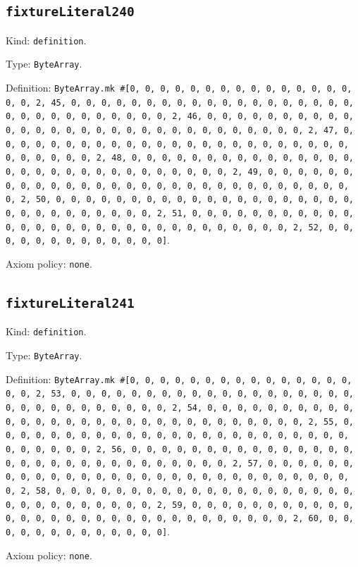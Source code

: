 \documentclass[11pt]{article}
\begin{document}
\subsection*{\texttt{fixtureLiteral240}}
\noindent Kind: \texttt{definition}.\par
\noindent Type: \texttt{ByteArray}.\par
\noindent Definition: \texttt{ByteArray.mk \#[0, 0, 0, 0, 0, 0, 0, 0, 0, 0, 0, 0, 0, 0, 0, 0, 0, 2, 45, 0, 0, 0, 0, 0, 0, 0, 0, 0, 0, 0, 0, 0, 0, 0, 0, 0, 0, 0, 0, 0, 0, 0, 0, 0, 0, 0, 0, 0, 0, 2, 46, 0, 0, 0, 0, 0, 0, 0, 0, 0, 0, 0, 0, 0, 0, 0, 0, 0, 0, 0, 0, 0, 0, 0, 0, 0, 0, 0, 0, 0, 0, 2, 47, 0, 0, 0, 0, 0, 0, 0, 0, 0, 0, 0, 0, 0, 0, 0, 0, 0, 0, 0, 0, 0, 0, 0, 0, 0, 0, 0, 0, 0, 0, 2, 48, 0, 0, 0, 0, 0, 0, 0, 0, 0, 0, 0, 0, 0, 0, 0, 0, 0, 0, 0, 0, 0, 0, 0, 0, 0, 0, 0, 0, 0, 0, 2, 49, 0, 0, 0, 0, 0, 0, 0, 0, 0, 0, 0, 0, 0, 0, 0, 0, 0, 0, 0, 0, 0, 0, 0, 0, 0, 0, 0, 0, 0, 0, 2, 50, 0, 0, 0, 0, 0, 0, 0, 0, 0, 0, 0, 0, 0, 0, 0, 0, 0, 0, 0, 0, 0, 0, 0, 0, 0, 0, 0, 0, 0, 0, 2, 51, 0, 0, 0, 0, 0, 0, 0, 0, 0, 0, 0, 0, 0, 0, 0, 0, 0, 0, 0, 0, 0, 0, 0, 0, 0, 0, 0, 0, 0, 0, 2, 52, 0, 0, 0, 0, 0, 0, 0, 0, 0, 0, 0, 0, 0]}.\par
\noindent Axiom policy: \texttt{none}.\par
\subsection*{\texttt{fixtureLiteral241}}
\noindent Kind: \texttt{definition}.\par
\noindent Type: \texttt{ByteArray}.\par
\noindent Definition: \texttt{ByteArray.mk \#[0, 0, 0, 0, 0, 0, 0, 0, 0, 0, 0, 0, 0, 0, 0, 0, 0, 2, 53, 0, 0, 0, 0, 0, 0, 0, 0, 0, 0, 0, 0, 0, 0, 0, 0, 0, 0, 0, 0, 0, 0, 0, 0, 0, 0, 0, 0, 0, 0, 2, 54, 0, 0, 0, 0, 0, 0, 0, 0, 0, 0, 0, 0, 0, 0, 0, 0, 0, 0, 0, 0, 0, 0, 0, 0, 0, 0, 0, 0, 0, 0, 2, 55, 0, 0, 0, 0, 0, 0, 0, 0, 0, 0, 0, 0, 0, 0, 0, 0, 0, 0, 0, 0, 0, 0, 0, 0, 0, 0, 0, 0, 0, 0, 2, 56, 0, 0, 0, 0, 0, 0, 0, 0, 0, 0, 0, 0, 0, 0, 0, 0, 0, 0, 0, 0, 0, 0, 0, 0, 0, 0, 0, 0, 0, 0, 2, 57, 0, 0, 0, 0, 0, 0, 0, 0, 0, 0, 0, 0, 0, 0, 0, 0, 0, 0, 0, 0, 0, 0, 0, 0, 0, 0, 0, 0, 0, 0, 2, 58, 0, 0, 0, 0, 0, 0, 0, 0, 0, 0, 0, 0, 0, 0, 0, 0, 0, 0, 0, 0, 0, 0, 0, 0, 0, 0, 0, 0, 0, 0, 2, 59, 0, 0, 0, 0, 0, 0, 0, 0, 0, 0, 0, 0, 0, 0, 0, 0, 0, 0, 0, 0, 0, 0, 0, 0, 0, 0, 0, 0, 0, 0, 2, 60, 0, 0, 0, 0, 0, 0, 0, 0, 0, 0, 0, 0, 0]}.\par
\noindent Axiom policy: \texttt{none}.\par
\end{document}
